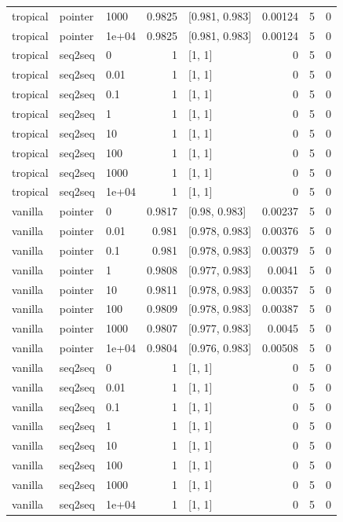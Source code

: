 \documentclass[10pt]{article}
\begin{document}
{\begin{longtable}{lllrlrrr}
tropical & pointer & 1000 & 0.9825 & [0.981, 0.983] & 0.00124 & 5 & 0\\
tropical & pointer & 1e+04 & 0.9825 & [0.981, 0.983] & 0.00124 & 5 & 0\\
tropical & seq2seq & 0 & 1 & [1, 1] & 0 & 5 & 0\\
tropical & seq2seq & 0.01 & 1 & [1, 1] & 0 & 5 & 0\\
tropical & seq2seq & 0.1 & 1 & [1, 1] & 0 & 5 & 0\\
tropical & seq2seq & 1 & 1 & [1, 1] & 0 & 5 & 0\\
tropical & seq2seq & 10 & 1 & [1, 1] & 0 & 5 & 0\\
tropical & seq2seq & 100 & 1 & [1, 1] & 0 & 5 & 0\\
tropical & seq2seq & 1000 & 1 & [1, 1] & 0 & 5 & 0\\
tropical & seq2seq & 1e+04 & 1 & [1, 1] & 0 & 5 & 0\\
vanilla & pointer & 0 & 0.9817 & [0.98, 0.983] & 0.00237 & 5 & 0\\
vanilla & pointer & 0.01 & 0.981 & [0.978, 0.983] & 0.00376 & 5 & 0\\
vanilla & pointer & 0.1 & 0.981 & [0.978, 0.983] & 0.00379 & 5 & 0\\
vanilla & pointer & 1 & 0.9808 & [0.977, 0.983] & 0.0041 & 5 & 0\\
vanilla & pointer & 10 & 0.9811 & [0.978, 0.983] & 0.00357 & 5 & 0\\
vanilla & pointer & 100 & 0.9809 & [0.978, 0.983] & 0.00387 & 5 & 0\\
vanilla & pointer & 1000 & 0.9807 & [0.977, 0.983] & 0.0045 & 5 & 0\\
vanilla & pointer & 1e+04 & 0.9804 & [0.976, 0.983] & 0.00508 & 5 & 0\\
vanilla & seq2seq & 0 & 1 & [1, 1] & 0 & 5 & 0\\
vanilla & seq2seq & 0.01 & 1 & [1, 1] & 0 & 5 & 0\\
vanilla & seq2seq & 0.1 & 1 & [1, 1] & 0 & 5 & 0\\
vanilla & seq2seq & 1 & 1 & [1, 1] & 0 & 5 & 0\\
vanilla & seq2seq & 10 & 1 & [1, 1] & 0 & 5 & 0\\
vanilla & seq2seq & 100 & 1 & [1, 1] & 0 & 5 & 0\\
vanilla & seq2seq & 1000 & 1 & [1, 1] & 0 & 5 & 0\\
vanilla & seq2seq & 1e+04 & 1 & [1, 1] & 0 & 5 & 0\\
\bottomrule
\end{longtable}
}
\end{document}
